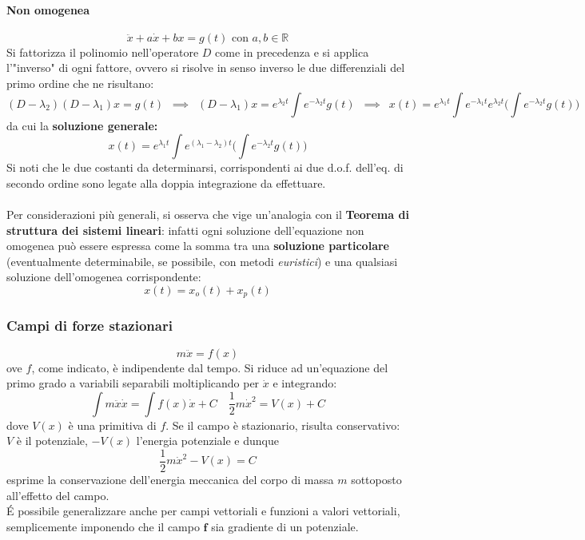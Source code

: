\documentclass[10pt]{article}
\theoremstyle{plain}
\begin{document}
\paragraph*{Non omogenea}
\[\ddot x + a \dot x + b x = g(t) \textrm{ con } a, b \in \mathbb{R}\]
Si fattorizza il polinomio nell'operatore $D$ come in precedenza e si applica l'"inverso" di ogni fattore, ovvero si risolve in senso inverso le due differenziali del primo ordine che ne risultano:
\[(D - \lambda_2) (D - \lambda_1) x = g(t) \enspace \implies \enspace (D - \lambda_1) x = e^{\lambda_2 t} \int e^{- \lambda_2 t} g(t) \enspace \implies \enspace x(t) = e^{\lambda_1 t}\int e^{- \lambda_1 t} e^{\lambda_2 t} \bigg(\int e^{- \lambda_2 t}g(t)\bigg)\]
da cui la \textbf{soluzione generale:}
\[\boxed{x(t) = e^{\lambda_1 t}\int e^{(\lambda_1 - \lambda_2) t} \bigg(\int e^{- \lambda_2 t}g(t)\bigg)}\]
Si noti che le due costanti da determinarsi, corrispondenti ai due d.o.f. dell'eq. di secondo ordine sono legate alla doppia integrazione da effettuare.
\\~\\Per considerazioni più generali, si osserva che vige un'analogia con il \textbf{Teorema di struttura dei sistemi lineari}: infatti ogni soluzione dell'equazione non omogenea può essere espressa come la somma tra una \textbf{soluzione particolare} (eventualmente determinabile, se possibile, con metodi \textit{euristici}) e una qualsiasi soluzione dell'omogenea corrispondente:
\[x(t) = x_o(t) + x_p(t)\]

\subsubsection{Campi di forze stazionari}
\[m \ddot x = f(x)\]
ove $f$, come indicato, è indipendente dal tempo. Si riduce ad un'equazione del primo grado a variabili separabili moltiplicando per $\dot x$ e integrando: 
\[\int m \ddot x \dot x = \int f(x) \dot x + C \quad \frac{1}{2} m \dot x^2 = V(x) + C\]
dove $V(x)$ è una primitiva di $f$. Se il campo è stazionario, risulta conservativo: $V$ è il potenziale, $-V(x)$ l'energia potenziale e dunque
\[\frac{1}{2} m \dot x^2 - V(x) = C\]
esprime la conservazione dell'energia meccanica del corpo di massa $m$ sottoposto all'effetto del campo.
\\\'E possibile generalizzare anche per campi vettoriali e funzioni a valori vettoriali, semplicemente imponendo che il campo $\mathbf{f}$ sia gradiente di un potenziale.
\end{document}
